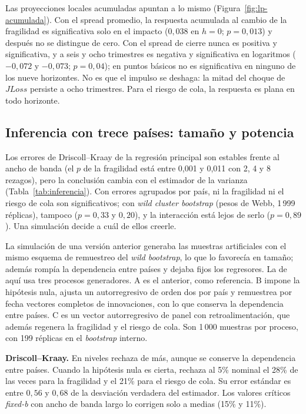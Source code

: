 Las proyecciones locales acumuladas apuntan a lo mismo (Figura~\ref{fig:lp-acumulada}). Con el spread promedio, la respuesta acumulada al cambio de la fragilidad es significativa solo en el impacto ($0{,}038$ en $h=0$; $p=0{,}013$) y después no se distingue de cero. Con el spread de cierre nunca es positiva y significativa, y a seis y ocho trimestres es negativa y significativa en logaritmos ($-0{,}072$ y $-0{,}073$; $p=0{,}04$); en puntos básicos no es significativa en ninguno de los nueve horizontes. No es que el impulso se deshaga: la mitad del choque de $JLoss$ persiste a ocho trimestres. Para el riesgo de cola, la respuesta es plana en todo horizonte.


\subsection{Inferencia con trece países: tamaño y potencia}
\label{sec:inferencia-potencia}

Los errores de Driscoll--Kraay de la regresión principal son estables frente al ancho de banda (el $p$ de la fragilidad está entre 0,001 y 0,011 con 2, 4 y 8 rezagos), pero la conclusión cambia con el estimador de la varianza (Tabla~\ref{tab:inferencia}). Con errores agrupados por país, ni la fragilidad ni el riesgo de cola son significativos; con \textit{wild cluster bootstrap} (pesos de Webb, 1\,999 réplicas), tampoco ($p=0{,}33$ y $0{,}20$), y la interacción está lejos de serlo ($p=0{,}89$). Una simulación decide a cuál de ellos creerle.

La simulación de una versión anterior generaba las muestras artificiales con el mismo esquema de remuestreo del \textit{wild bootstrap}, lo que lo favorecía en tamaño; además rompía la dependencia entre países y dejaba fijos los regresores. La de aquí usa tres procesos generadores. A es el anterior, como referencia. B impone la hipótesis nula, ajusta un autorregresivo de orden dos por país y remuestrea por fecha vectores completos de innovaciones, con lo que conserva la dependencia entre países. C es un vector autorregresivo de panel con retroalimentación, que además regenera la fragilidad y el riesgo de cola. Son 1\,000 muestras por proceso, con 199 réplicas en el \textit{bootstrap} interno.


\textbf{Driscoll--Kraay.} En niveles rechaza de más, aunque se conserve la dependencia entre países. Cuando la hipótesis nula es cierta, rechaza al 5\% nominal el 28\% de las veces para la fragilidad y el 21\% para el riesgo de cola. Su error estándar es entre $0{,}56$ y $0{,}68$ de la desviación verdadera del estimador. Los valores críticos \textit{fixed-b} con ancho de banda largo lo corrigen solo a medias (15\% y 11\%).

